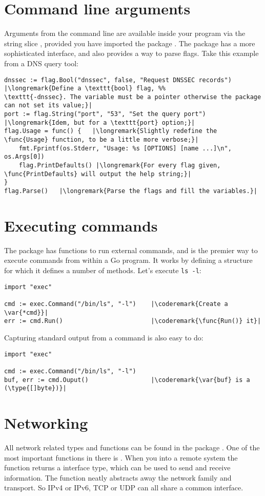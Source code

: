 \section{Command line arguments}
\label{sec:option parsing}
Arguments from the command line are available inside your program via
the string slice , provided you have imported the package
. The  package has a more sophisticated
interface, and also provides a way to parse flags. Take this example
from a DNS query tool:
\begin{lstlisting}
dnssec := flag.Bool("dnssec", false, "Request DNSSEC records") |\longremark{Define a \texttt{bool} flag, %%
\texttt{-dnssec}. The variable must be a pointer otherwise the package can not set its value;}|
port := flag.String("port", "53", "Set the query port")      |\longremark{Idem, but for a \texttt{port} option;}|
flag.Usage = func() {   |\longremark{Slightly redefine the \func{Usage} function, to be a little more verbose;}|
    fmt.Fprintf(os.Stderr, "Usage: %s [OPTIONS] [name ...]\n", os.Args[0])
    flag.PrintDefaults() |\longremark{For every flag given, \func{PrintDefaults} will output the help string;}|
}
flag.Parse()   |\longremark{Parse the flags and fill the variables.}|
\end{lstlisting}
\showremarks

\section{Executing commands}
The  package has functions to run external commands, and is the premier way to
execute commands from within a Go program. It works by defining a  structure for which it
defines a number of methods.
Let's execute \verb|ls -l|:
\begin{lstlisting}
import "exec"

cmd := exec.Command("/bin/ls", "-l")    |\coderemark{Create a \var{*cmd}}|
err := cmd.Run()                        |\coderemark{\func{Run()} it}|
\end{lstlisting}
Capturing standard output from a command is also easy to do:
\begin{lstlisting}
import "exec"

cmd := exec.Command("/bin/ls", "-l")
buf, err := cmd.Ouput()                 |\coderemark{\var{buf} is a (\type{[]byte})}|
\end{lstlisting}

\section{Networking}
All network related types and functions can be found in the package . One of the
most important functions in there is . When you 
into a remote system the function returns a  interface type, which can be used
to send and receive information. The function  neatly abstracts away the network
family and transport. So IPv4 or IPv6, TCP or UDP can all share a common interface. 

